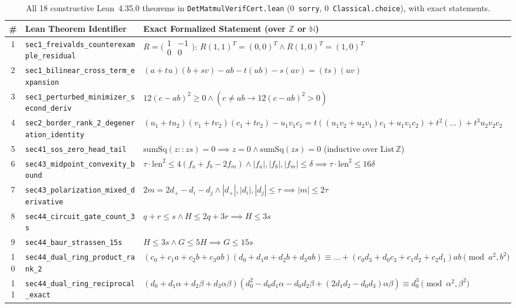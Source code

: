 \documentclass[10pt,twocolumn]{article}
\begin{document}
\begin{table}[t]
\centering
\scriptsize
\setlength{\tabcolsep}{2.8pt}
\caption{All 18 constructive Lean~4.35.0 theorems in \texttt{DetMatmulVerifCert.lean} (0~\texttt{sorry}, 0~\texttt{Classical.choice}), with exact statements.}
\label{tab:lean}
\begin{tabular}{@{}cll@{}}
\toprule
\# & Lean Theorem Identifier & Exact Formalized Statement (over $\mathbb{Z}$ or $\mathbb{N}$) \\
\midrule
1 & \texttt{sec1\_freivalds\_counterexample\_residual} & $R=\bigl(\begin{smallmatrix}1&-1\\0&0\end{smallmatrix}\bigr)$: $R(1,1)^T=(0,0)^T \wedge R(1,0)^T=(1,0)^T$ \\
2 & \texttt{sec1\_bilinear\_cross\_term\_expansion} & $(a+tu)(b+sv) - ab - t(ub) - s(av) = (ts)(uv)$ \\
3 & \texttt{sec1\_perturbed\_minimizer\_second\_deriv} & $12(c-ab)^2 \ge 0 \wedge (c\neq ab \to 12(c-ab)^2 > 0)$ \\
4 & \texttt{sec2\_border\_rank\_2\_degeneration\_identity} & $(u_1+tu_2)(v_1+tv_2)(c_1+tc_2)-u_1v_1c_1 = t((u_1v_2+u_2v_1)c_1+u_1v_1c_2) + t^2(\dots) + t^3 u_2v_2c_2$ \\
5 & \texttt{sec41\_sos\_zero\_head\_tail} & $\mathrm{sumSq}(z::zs)=0 \implies z=0 \wedge \mathrm{sumSq}(zs)=0$ (inductive over $\mathrm{List}\,\mathbb{Z}$) \\
6 & \texttt{sec43\_midpoint\_convexity\_bound} & $\tau\cdot\mathrm{len}^2 \le 4(f_a+f_b-2f_m) \wedge |f_a|,|f_b|,|f_m|\le\delta \implies \tau\cdot\mathrm{len}^2 \le 16\delta$ \\
7 & \texttt{sec43\_polarization\_mixed\_derivative} & $2m=2d_+ - d_i - d_j \wedge |d_+|,|d_i|,|d_j|\le\tau \implies |m|\le 2\tau$ \\
8 & \texttt{sec44\_circuit\_gate\_count\_3s} & $q+r\le s \wedge H \le 2q+3r \implies H \le 3s$ \\
9 & \texttt{sec44\_baur\_strassen\_15s} & $H \le 3s \wedge G \le 5H \implies G \le 15s$ \\
10 & \texttt{sec44\_dual\_ring\_product\_rank\_2} & $(c_0+c_1a+c_2b+c_3ab)(d_0+d_1a+d_2b+d_3ab) \equiv \dots+(c_0d_3+d_0c_3+c_1d_2+c_2d_1)ab \pmod{a^2,b^2}$ \\
11 & \texttt{sec44\_dual\_ring\_reciprocal\_exact} & $(d_0+d_1\alpha+d_2\beta+d_3\alpha\beta)(d_0^2-d_0d_1\alpha-d_0d_2\beta+(2d_1d_2-d_0d_3)\alpha\beta) \equiv d_0^3 \pmod{\alpha^2,\beta^2}$ \\

\end{tabular}
\end{table}
\end{document}
